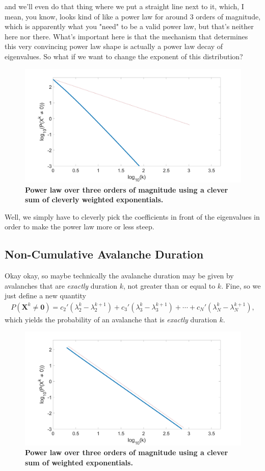 \documentclass[superscriptaddress]{revtex4-1}
\begin{document}
and we'll even do that thing where we put a straight line next to it, which, I mean, you know, looks kind of like a power law for around 3 orders of magnitude, which is apparently what you "need" to be a valid power law, but that's neither here nor there. What's important here is that the mechanism that determines this very convincing power law shape is actually a power law decay of eigenvalues. So what if we want to change the exponent of this distribution?
\begin{figure}[h!]
	\centering
	\includegraphics[width=0.5\columnwidth]{power_exp_2.jpg}
	\caption{\textbf{Power law over three orders of magnitude using a clever sum of cleverly weighted exponentials.}}
\end{figure}

Well, we simply have to cleverly pick the coefficients in front of the eigenvalues in order to make the power law more or less steep.
\FloatBarrier





\subsection{Non-Cumulative Avalanche Duration}
Okay okay, so maybe technically the avalanche duration may be given by avalanches that are \emph{exactly} duration $k$, not greater than or equal to $k$. Fine, so we just define a new quantity
\begin{align*}
P(\bm{X}^k \neq \bm{0}) = c_2'(\lambda_2^k - \lambda_2^{k+1}) + c_3'(\lambda_3^k - \lambda_3^{k+1}) + \dotsm + c_N'(\lambda_N^k - \lambda_N^{k+1}),
\end{align*}
which yields the probability of an avalanche that is \emph{exactly} duration $k$. 
\begin{figure}[h!]
	\centering
	\includegraphics[width=0.5\columnwidth]{power_exp_diff_1.jpg}
	\caption{\textbf{Power law over three orders of magnitude using a clever sum of weighted exponentials.}}
\end{figure}
\end{document}

